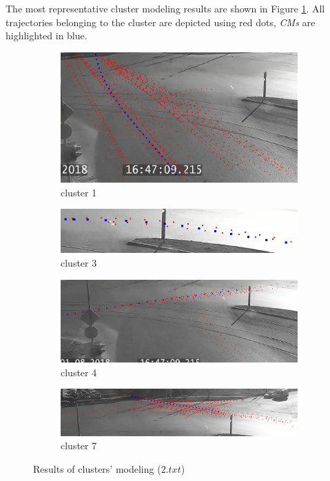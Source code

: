 The most representative cluster modeling results are shown in Figure \ref{fig:cm-res}. All trajectories belonging to the cluster are depicted using red dots, \textit{CMs} are highlighted in blue.

\begin{figure}[!htb]
	\centering
	\begin{subfigure}[!htb]{0.7\textwidth}
		\centering{}
		\includegraphics[width=\textwidth]{images/cm-1-from-8-0_95.png}
		\caption{cluster 1}
	\end{subfigure}
	\hfill
	\begin{subfigure}[!htb]{0.7\textwidth}
		\centering{}
		\includegraphics[width=\textwidth]{images/cm-3-from-8-0_95.png}
		\caption{cluster 3}
	\end{subfigure}
	\hfill
	\begin{subfigure}[!htb]{0.7\textwidth}
		\centering{}
		\includegraphics[width=\textwidth]{images/cm-4-from-8-0_95.png}
		\caption{cluster 4}
	\end{subfigure}
	\hfill
	\begin{subfigure}[!htb]{0.7\textwidth}
		\centering{}
		\includegraphics[width=\textwidth]{images/cm-7-from-8-0_95.png}
		\caption{cluster 7}
	\end{subfigure}
	
	\caption{Results of clusters' modeling ($2.txt$)}
	\label{fig:cm-res}
\end{figure}

